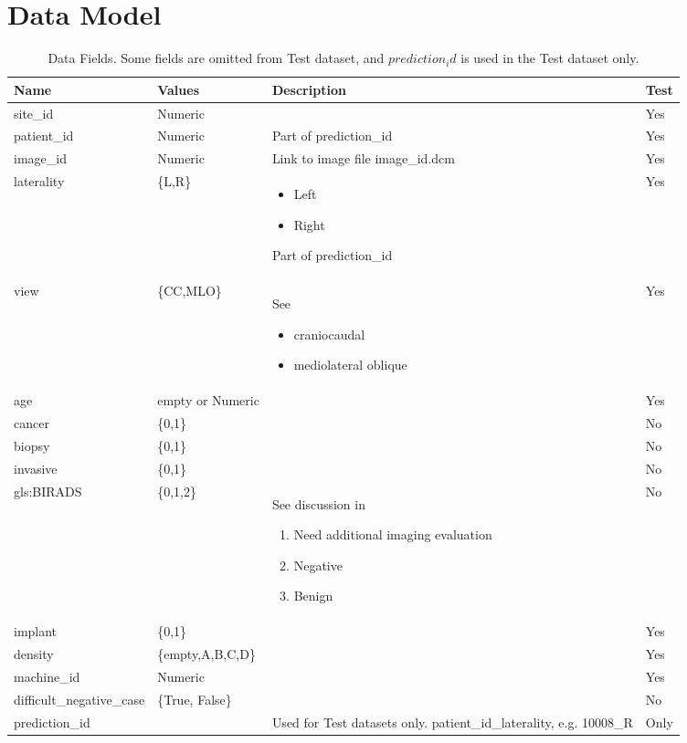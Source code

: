 \documentclass[]{article}
\begin{document}
\section{Data Model}
\begin{table}[H]
	\begin{center}
		\caption[Data Fields]{Data Fields. Some fields are omitted from Test dataset, and $prediction_id$ is used in the Test dataset only.}
		\begin{tabular}{|l|l|p{5cm}|l|}   \hline
			Name&Values&Description&Test\\  \hline
			site\_id&Numeric&&Yes\\  \hline
			patient\_id&Numeric&Part of	prediction\_id&Yes\\  \hline
			image\_id&Numeric&Link to image file image\_id.dcm&Yes\\  \hline
			laterality&\{L,R\}&\begin{itemize}
				\item Left
				\item Right
			\end{itemize}Part of	prediction\_id&Yes\\  \hline
			view&\{CC,MLO\}& See \cite{murphy2021mamography} \begin{itemize}
				\item craniocaudal 
				\item mediolateral oblique
			\end{itemize}&Yes\\  \hline
			age&empty or Numeric&&Yes\\  \hline
			cancer&\{0,1\}&&No\\  \hline
			biopsy&\{0,1\}&&No\\  \hline
			invasive&\{0,1\}&&No\\  \hline
			\gls{gls:BIRADS}&\{0,1,2\}&See discussion in \cite{pan2022what}\begin{enumerate}[start=0]
				\item Need additional imaging evaluation
				\item Negative
				\item Benign
			\end{enumerate}&No\\  \hline
			implant&\{0,1\}&&Yes\\  \hline
			density&\{empty,A,B,C,D\}&&Yes\\  \hline
			machine\_id&Numeric&&Yes\\  \hline
			difficult\_negative\_case&\{True, False\}&&No\\  \hline
			prediction\_id&&Used for Test datasets only. patient\_id\_laterality, e.g. 10008\_R&Only\\  \hline
		\end{tabular}
	\end{center}
\end{table}
\end{document}
